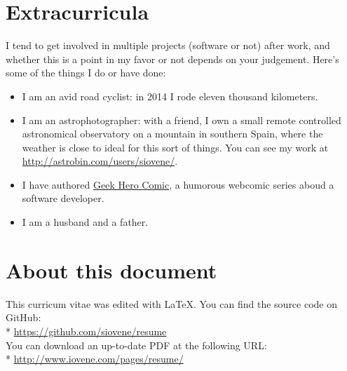 \documentclass[10pt]{tccv}
\begin{document}
		\section{Extracurricula}
			I tend to get involved in multiple projects (software or not) after
			work, and whether this is a point in my favor or not depends on
			your judgement. Here's some of the things I do or have done:

			\begin{itemize}
				\item I am an avid road cyclist: in 2014 I rode eleven thousand
					kilometers.
				\item I am an astrophotographer: with a friend, I own a small
					remote controlled astronomical observatory on a mountain in
					southern Spain, where the weather is close to ideal for
					this sort of things. You can see my work at
					\url{http://astrobin.com/users/siovene/}.
				\item I have authored \href{http://www.geekherocomic.com}{Geek
					Hero Comic}, a humorous webcomic series aboud a software
					developer.
				\item I am a husband and a father.
			\end{itemize}


		\section{About this document}
			This curricum vitae was edited with \LaTeX. You can find the source
			code on GitHub:\\*
			\url{https://github.com/siovene/resume}\\

			You can download an up-to-date PDF at the following URL:\\*
			\url{http://www.iovene.com/pages/resume/}\\
\end{document}
